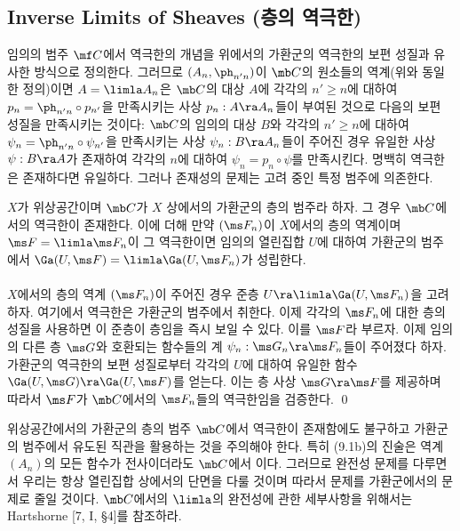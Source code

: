 	
	\subsection*{Inverse Limits of Sheaves (층의 역극한)}
	
	임의의 범주 $\mf C$에서 역극한의 개념을 위에서의 가환군의 역극한의 보편 성질과 유사한 방식으로 정의한다.
	그러므로 $(A_n,\ph_{n'n})$이 $\mb C$의 원소들의 역계(위와 동일한 정의)이면
	 $A=\limla A_n$은 $\mb C$의 대상 $A$에
	각각의 $n'\ge n$에 대하여 $p_n=\ph_{n'n}\circ p_{n'}$을 만족시키는 사상 $p_n:A\ra A_n$들이 부여된 것으로
	다음의 보편 성질을 만족시키는 것이다:
	$\mb C$의 임의의 대상 $B$와 각각의 $n'\ge n$에 대하여 $\psi_n=\ph_{n'n}\circ\psi_{n'}$을 만족시키는
	사상 $\psi_n:B\ra A_n$들이 주어진 경우 유일한 사상 $\psi:B\ra A$가 존재하여 각각의 $n$에 대하여 $\psi_n=p_n\circ\psi$를 만족시킨다.
	명백히 역극한은 존재하다면 유일하다. 그러나 존재성의 문제는 고려 중인 특정 범주에 의존한다.
	
	
	\begin{proposition}
	$X$가 위상공간이며 $\mb C$가 $X$ 상에서의 가환군의 층의 범주라 하자. 그 경우 $\mb C$에서의 역극한이 존재한다.
	이에 더해 만약 $(\ms F_n)$이 $X$에서의 층의 역계이며 $\ms F=\limla\ms F_n$이 그 역극한이면
	임의의 열린집합 $U$에 대하여 가환군의 범주에서 $\Ga(U,\ms F)=\limla\Ga(U,\ms F_n)$가 성립한다.\\\\
	\pf $X$에서의 층의 역계 $(\ms F_n)$이 주어진 경우 준층 $U\ra\limla\Ga(U,\ms F_n)$을 고려하자.
	여기에서 역극한은 가환군의 범주에서 취한다. 이제 각각의 $\ms F_n$에 대한 층의 성질을 사용하면 이 준층이 층임을 즉시 보일 수 있다.
	이를 $\ms F$라 부르자. 이제 임의의 다른 층 $\ms G$와 호환되는 함수들의 계 $\psi_n:\ms G_n\ra\ms F_n$들이 주어졌다 하자.
	가환군의 역극한의 보편 성질로부터 각각의 $U$에 대하여 유일한 함수 $\Ga(U,\ms G)\ra\Ga(U,\ms F)$를 얻는다.
	이는 층 사상 $\ms G\ra\ms F$를 제공하며 따라서 $\ms F$가 $\mb C$에서의 $\ms F_n$들의 역극한임을 검증한다.
	\qed
	\end{proposition}
	
	
	\begin{caution}
	위상공간에서의 가환군의 층의 범주 $\mb C$에서 역극한이 존재함에도 불구하고 가환군의 범주에서 유도된 직관을 활용하는 것을 주의해야 한다.
	특히 (9.1b)의 진술은 역계 $(A_n)$의 모든 함수가 전사이더라도 $\mb C$에서 이다.
	그러므로 완전성 문제를 다루면서 우리는 항상 열린집합 상에서의 단면을 다룰 것이며 따라서 문제를 가환군에서의 문제로 줄일 것이다.
	$\mb C$에서의 $\limla$의 완전성에 관한 세부사항을 위해서는 Hartshorne [7, I, \S 4]를 참조하라.
	\end{caution}
	
